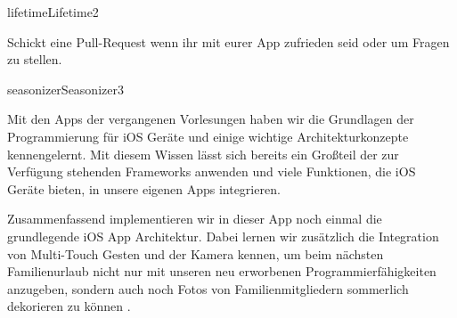 \documentclass[parskip=half, final]{scrreprt}
\begin{document}
\begin{lecture}
\begin{exc}
\begin{excitem}{lifetime}{Lifetime}{2}
\begin{enumerate}
Schickt eine Pull-Request wenn ihr mit eurer App zufrieden seid oder um Fragen zu stellen.

\end{enumerate}

\end{excitem}







\begin{excitem}{seasonizer}{Seasonizer}{3}

Mit den Apps der vergangenen Vorlesungen haben wir die Grundlagen der Programmierung für iOS Geräte und einige wichtige Architekturkonzepte kennengelernt. Mit diesem Wissen lässt sich bereits ein Großteil der zur Verfügung stehenden Frameworks anwenden und viele Funktionen, die iOS Geräte bieten, in unsere eigenen Apps integrieren.


Zusammenfassend implementieren wir in dieser App noch einmal die grundlegende iOS App Architektur. Dabei lernen wir zusätzlich die Integration von Multi-Touch Gesten und der Kamera kennen, um beim nächsten Familienurlaub nicht nur mit unseren neu erworbenen Programmierfähigkeiten anzugeben, sondern auch noch Fotos von Familienmitgliedern sommerlich dekorieren zu können .




\end{excitem}
\end{exc}
\end{lecture}
\end{document}
